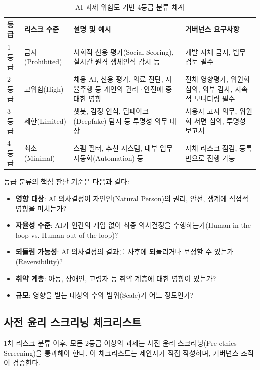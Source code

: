 \begin{table}[htbp]
\centering
\caption{AI 과제 위험도 기반 4등급 분류 체계}
\label{tab:risk_grades}
\begin{tabularx}{\textwidth}{p{1.5cm}p{2cm}Xp{3.5cm}}
\toprule
\textbf{등급} & \textbf{리스크 수준} & \textbf{설명 및 예시} & \textbf{거버넌스 요구사항} \\
\midrule
1등급 & 금지(Prohibited) & 사회적 신용 평가(Social Scoring), 실시간 원격 생체인식 감시 등 & 개발 자체 금지, 법무 검토 필수 \\
\midrule
2등급 & 고위험(High) & 채용 AI, 신용 평가, 의료 진단, 자율주행 등 개인의 권리·안전에 중대한 영향 & 전체 영향평가, 위원회 심의, 외부 감사, 지속적 모니터링 필수 \\
\midrule
3등급 & 제한(Limited) & 챗봇, 감정 인식, 딥페이크(Deepfake) 탐지 등 투명성\cite{arrieta2020explainable} 의무 대상 & 사용자 고지 의무, 위원회 서면 심의, 투명성 보고서 \\
\midrule
4등급 & 최소(Minimal) & 스팸 필터, 추천 시스템, 내부 업무 자동화(Automation) 등 & 자체 리스크 점검, 등록만으로 진행 가능 \\
\bottomrule
\end{tabularx}
\end{table}

등급 분류의 핵심 판단 기준은 다음과 같다:

\begin{itemize}
    \item \textbf{영향 대상}: AI 의사결정이 자연인(Natural Person)의 권리, 안전, 생계에 직접적 영향을 미치는가?
    \item \textbf{자율성 수준}: AI가 인간의 개입 없이 최종 의사결정을 수행하는가(Human-in-the-loop vs. Human-out-of-the-loop)?
    \item \textbf{되돌림 가능성}: AI 의사결정의 결과를 사후에 되돌리거나 보정할 수 있는가(Reversibility)?
    \item \textbf{취약 계층}: 아동, 장애인, 고령자 등 취약 계층에 대한 영향이 있는가?
    \item \textbf{규모}: 영향을 받는 대상의 수와 범위(Scale)가 어느 정도인가?
\end{itemize}

\subsection{사전 윤리 스크리닝 체크리스트}
\label{sec:8.2.3}

1차 리스크 분류 이후, 모든 2등급 이상의 과제는 사전 윤리 스크리닝(Pre-ethics Screening)을 통과해야 한다. 이 체크리스트는 제안자가 직접 작성하며, 거버넌스 조직이 검증한다.

